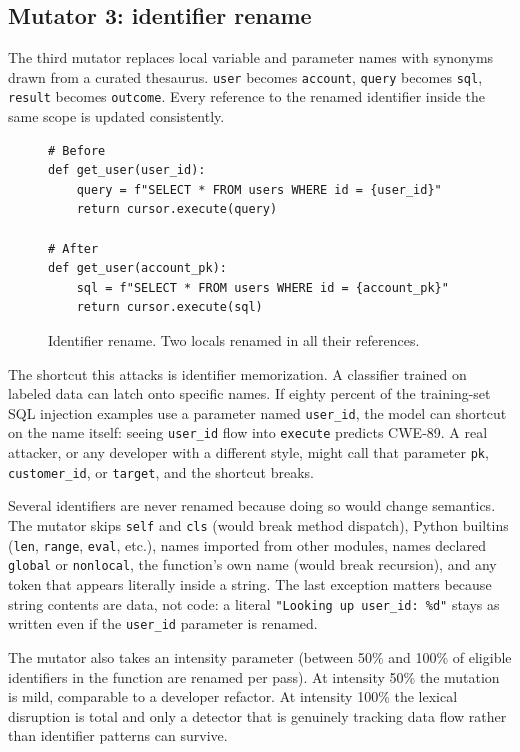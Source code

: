 \subsection{Mutator 3: identifier rename}
\label{sec:method:rename}

The third mutator replaces local variable and parameter names with
synonyms drawn from a curated thesaurus. \texttt{user} becomes
\texttt{account}, \texttt{query} becomes \texttt{sql},
\texttt{result} becomes \texttt{outcome}. Every reference to the
renamed identifier inside the same scope is updated consistently.

\begin{figure}[h]
\begin{verbatim}
# Before
def get_user(user_id):
    query = f"SELECT * FROM users WHERE id = {user_id}"
    return cursor.execute(query)

# After
def get_user(account_pk):
    sql = f"SELECT * FROM users WHERE id = {account_pk}"
    return cursor.execute(sql)
\end{verbatim}
\caption{Identifier rename. Two locals renamed in all their
references.}
\label{lst:rename}
\end{figure}

The shortcut this attacks is identifier memorization. A classifier
trained on labeled data can latch onto specific names. If eighty
percent of the training-set SQL injection examples use a parameter
named \texttt{user\_id}, the model can shortcut on the name itself:
seeing \texttt{user\_id} flow into \texttt{execute} predicts CWE-89.
A real attacker, or any developer with a different style, might call
that parameter \texttt{pk}, \texttt{customer\_id}, or \texttt{target},
and the shortcut breaks.

Several identifiers are never renamed because doing so would change
semantics. The mutator skips \texttt{self} and \texttt{cls} (would
break method dispatch), Python builtins (\texttt{len},
\texttt{range}, \texttt{eval}, etc.), names imported from other
modules, names declared \texttt{global} or \texttt{nonlocal}, the
function's own name (would break recursion), and any token that
appears literally inside a string. The last exception matters
because string contents are data, not code: a literal
\texttt{"Looking up user\_id: \%d"} stays as written even if the
\texttt{user\_id} parameter is renamed.

The mutator also takes an intensity parameter (between 50\% and 100\%
of eligible identifiers in the function are renamed per pass). At
intensity 50\% the mutation is mild, comparable to a developer
refactor. At intensity 100\% the lexical disruption is total and
only a detector that is genuinely tracking data flow rather than
identifier patterns can survive.

